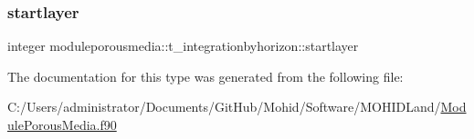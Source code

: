 \mbox{\label{structmoduleporousmedia_1_1t__integrationbyhorizon_a01084aa43501884f16613e6341305266}} 
\subsubsection{\texorpdfstring{startlayer}{startlayer}}
{\footnotesize\ttfamily integer moduleporousmedia\+::t\+\_\+integrationbyhorizon\+::startlayer\hspace{0.3cm}{\ttfamily [private]}}



The documentation for this type was generated from the following file\+:\begin{DoxyCompactItemize}
\item 
C\+:/\+Users/administrator/\+Documents/\+Git\+Hub/\+Mohid/\+Software/\+M\+O\+H\+I\+D\+Land/\mbox{\hyperlink{_module_porous_media_8f90}{Module\+Porous\+Media.\+f90}}\end{DoxyCompactItemize}
